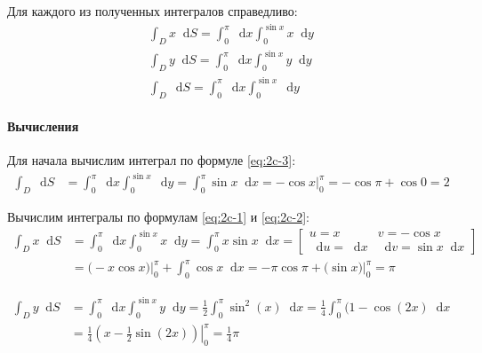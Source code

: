 \documentclass[a4paper,12pt]{article}
\newcommand*\diff{\mathop{}\!\mathrm{d}}
\begin{document}
Для каждого из полученных интегралов справедливо:
\begin{align}
  \int_{D} x \diff S = \int_{0}^{\pi} \diff x \int_{0}^{\sin x} x \diff y
  \label{eq:2c-1} \\
  \int_{D} y \diff S = \int_{0}^{\pi} \diff x \int_{0}^{\sin x} y \diff y
  \label{eq:2c-2} \\
  \int_{D} \diff S = \int_{0}^{\pi} \diff x \int_{0}^{\sin x} \diff y
  \label{eq:2c-3}
\end{align}

\paragraph{Вычисления}

Для начала вычислим интеграл по формуле \ref{eq:2c-3}:
\begin{equation} \label{eq:2c-3-calc}
\begin{split}
  \int_{D} \diff S
    &= \int_{0}^{\pi} \diff x \int_{0}^{\sin x} \diff y
     = \int_{0}^{\pi} \sin x \diff x
     = - \cos x \bigg\rvert_{0}^{\pi}
     = - \cos \pi + \cos 0 = 2
\end{split}
\end{equation}

Вычислим интегралы по формулам \ref{eq:2c-1} и \ref{eq:2c-2}:
\begin{equation} \label{eq:2c-1-calc}
\begin{split}
  \int_{D} x \diff S
  &= \int_{0}^{\pi} \diff x \int_{0}^{\sin x} x \diff y
   = \int_{0}^{\pi} x \sin x \diff x
   =
    \begin{bmatrix}
      u = x & v = - \cos x \\
      \diff u = \diff x & \diff v = \sin x \diff x
    \end{bmatrix} \\
  &= \bigg( -x \cos x \bigg) \bigg\rvert_{0}^{\pi}
   + \int_{0}^{\pi} \cos x \diff x
   = - \pi \cos\pi + \bigg( \sin x \bigg) \bigg\rvert_{0}^{\pi}
   = \pi
\end{split}
\end{equation}


\begin{equation} \label{eq:2c-2-calc}
\begin{split}
  \int_{D} y \diff S
  &= \int_{0}^{\pi} \diff x \int_{0}^{\sin x} y \diff y
   = \frac{1}{2} \int_{0}^{\pi} \sin^{2}(x) \diff x
   = \frac{1}{4} \int_{0}^{\pi} (1 - \cos(2x) \diff x \\
  &= \frac{1}{4}
     \left.\left(x - \frac{1}{2} \sin(2x) \right)\right\rvert_{0}^{\pi}
   = \frac{1}{4} \pi
\end{split}
\end{equation}
\end{document}
